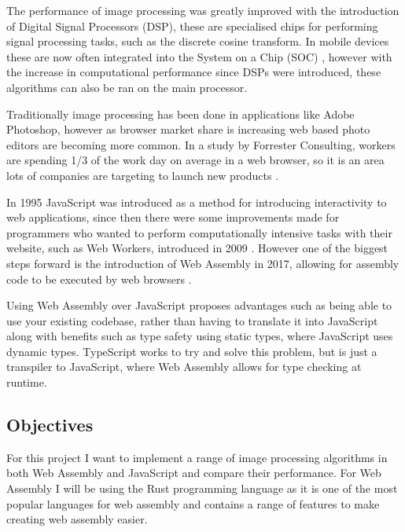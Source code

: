 \documentclass[12pt,a4paper]{article}
\begin{document}

The performance of image processing was greatly improved with the introduction of Digital Signal Processors (DSP), these are specialised chips for performing signal processing tasks, such as the discrete cosine transform. In mobile devices these are now often integrated into the System on a Chip (SOC) \cite{angoletta2008digital}, however with the increase in computational performance since DSPs were introduced, these algorithms can also be ran on the main processor.

Traditionally image processing has been done in applications like Adobe Photoshop, however as browser market share is increasing web based photo editors are becoming more common. In a study by Forrester Consulting, workers are spending 1/3 of the work day on average in a web browser, so it is an area lots of companies are targeting to launch new products \cite{cloud_worker}.

In 1995 JavaScript was introduced as a method for introducing interactivity to web applications, since then there were some improvements made for programmers who wanted to perform computationally intensive tasks with their website, such as Web Workers, introduced in 2009 \cite{Hickson}. However one of the biggest steps forward is the introduction of Web Assembly in 2017, allowing for assembly code to be executed by web browsers \cite{haas2017bringing}.

Using Web Assembly over JavaScript proposes advantages such as being able to use your existing codebase, rather than having to translate it into JavaScript along with benefits such as type safety using static types, where JavaScript uses dynamic types. TypeScript works to try and solve this problem, but is just a transpiler to JavaScript, where Web Assembly allows for type checking at runtime.

\subsection{Objectives}

For this project I want to implement a range of image processing algorithms in both Web Assembly and JavaScript and compare their performance. For Web Assembly I will be using the Rust programming language as it is one of the most popular languages for web assembly and contains a range of features to make creating web assembly easier.

\end{document}
